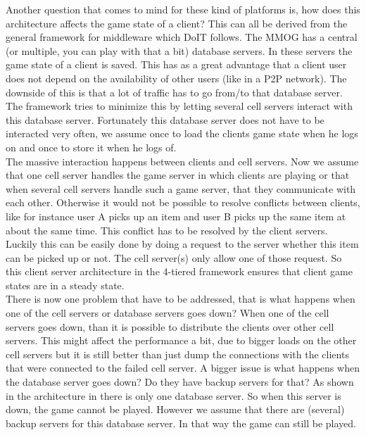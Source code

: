 \noindent Another question that comes to mind for these kind of platforms is, how does this architecture affects the game state of a client? 
This can all be derived from the general framework for middleware which DoIT follows. 
The MMOG has a central (or multiple, you can play with that a bit) database servers. 
In these servers the game state of a client is saved. 
This has as a great advantage that a client user does not depend on the availability of other users (like in a P2P network). 
The downside of this is that a lot of traffic has to go from/to that database server.
The framework tries to minimize this by letting several cell servers interact with this database server.
Fortunately this database server does not have to be interacted very often, we assume once to load the clients game state when he logs on and once to store it when he logs of. \\
\indent The massive interaction happens between clients and cell servers. 
Now we assume that one cell server handles the game server in which clients are playing or that when several cell servers handle such a game server, that they communicate with each other. 
Otherwise it would not be possible to resolve conflicts between clients, like for instance user A picks up an item and user B picks up the same item at about the same time. 
This conflict has to be resolved by the client servers. 
Luckily this can be easily done by doing a request to the server whether this item can be picked up or not. 
The cell server(s) only allow one of those request. So this client server architecture in the 4-tiered framework ensures that client game states are in a steady state.\\
\indent There is now one problem that have to be addressed, that is what happens when one of the cell servers or database servers goes down?
When one of the cell servers goes down, than it is possible to distribute the clients over other cell servers. 
This might affect the performance a bit, due to bigger loads on the other cell servers but it is still better than just dump the connections with the clients that were connected to the failed cell server. 
A bigger issue is what happens when the database server goes down? 
Do they have backup servers for that? 
As shown in the architecture in \cite{midfig} there is only one database server. 
So when this server is down, the game cannot be played. 
However we assume that there are (several) backup servers for this database server. 
In that way the game can still be played.\\
\\
